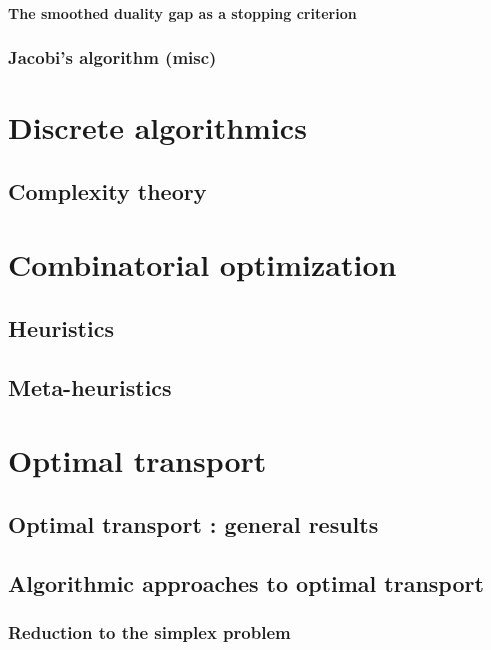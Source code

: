 \documentclass[12pt,openany,oneside]{book}
\theoremstyle{definition}
\numberwithin{definition}{section}
\numberwithin{theorem}{section}
\numberwithin{corollary}{section}
\numberwithin{proposition}{section}
\numberwithin{notation}{section}
\numberwithin{remark}{section}
\numberwithin{hypothesis}{section}
\numberwithin{example}{section}
\begin{document}
\subsection{The smoothed duality gap as a stopping criterion}
\section{Jacobi's algorithm (misc)}

\part{Discrete algorithmics}

\chapter{Complexity theory}



\part{Combinatorial optimization}

\chapter{Heuristics}\label{chap:heuristics}
\chapter{Meta-heuristics}\label{chap:meta-heuristics}

\part{Optimal transport}

\chapter{Optimal transport : general  results}

\chapter{Algorithmic approaches to optimal transport}

\section{Reduction to the simplex problem}
\end{document}
